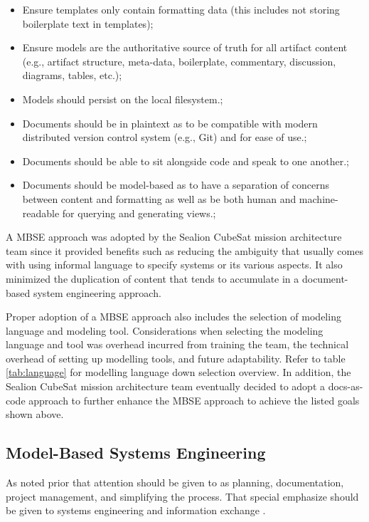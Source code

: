 \documentclass[journal,article,submit,pdftex,moreauthors]{Definitions/mdpi}
\begin{document}
\begin{itemize}
	\item	Ensure templates only contain formatting data (this includes not storing boilerplate text in templates);
	\item	Ensure models are the authoritative source of truth for all artifact content (e.g., artifact structure, meta-data, boilerplate, commentary, discussion, diagrams, tables, etc.);
	\item 	Models should persist on the local filesystem.;
	\item 	Documents should be in plaintext as to be compatible with modern distributed version control system (e.g., Git) and for ease of use.;
	\item 	Documents should be able to sit alongside code and speak to one another.;
	\item 	Documents should be model-based as to have a separation of concerns between content and formatting as well as be both human and machine-readable for querying and generating views.;
\end{itemize}

A MBSE approach was adopted by the Sealion CubeSat mission architecture team since it provided benefits such as reducing the ambiguity that usually comes with using informal language to specify systems or its various aspects.  It also minimized the duplication of content that tends to accumulate in a document-based system engineering approach.

Proper adoption of a MBSE approach also includes the selection of modeling language and modeling tool.  Considerations when selecting the modeling language and tool was overhead incurred from training the team, the technical overhead of setting up modelling tools, and future adaptability.  Refer to table \ref{tab:language} for modelling language down selection overview.  In addition, the Sealion CubeSat mission architecture team eventually decided to adopt a docs-as-code approach to further enhance the MBSE approach to achieve the listed goals shown above.

\subsection{Model-Based Systems Engineering}
As noted prior that attention should be given to as planning, documentation, project management, and simplifying the process.  That special emphasize should be given to systems engineering and information exchange \cite{aalto}.
\end{document}
